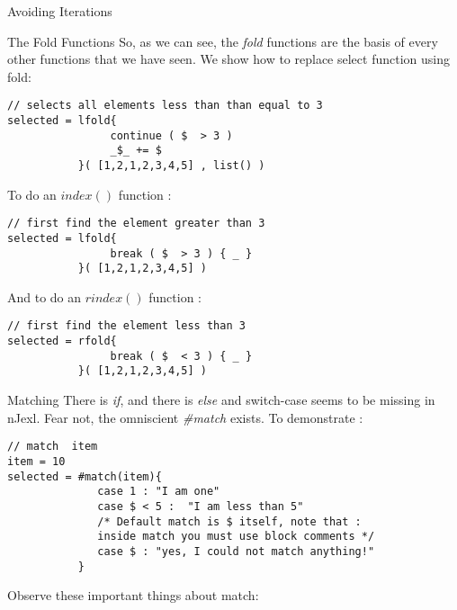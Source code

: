 \begin{section}{Avoiding Iterations}
\begin{subsection}{The Fold Functions}
So, as we can see, the \emph{fold} functions are the basis of every other functions
that we have seen. We show how to replace select function using fold: 
\begin{lstlisting}[style=JexlStyle]
// selects all elements less than than equal to 3
selected = lfold{ 
                continue ( $  > 3 )  
                _$_ += $   
           }( [1,2,1,2,3,4,5] , list() )
\end{lstlisting}

To do an $index()$ function : 

\begin{lstlisting}[style=JexlStyle]
// first find the element greater than 3
selected = lfold{ 
                break ( $  > 3 ) { _ }   
           }( [1,2,1,2,3,4,5] )
\end{lstlisting}

And to do an $rindex()$ function : 

\begin{lstlisting}[style=JexlStyle]
// first find the element less than 3
selected = rfold{ 
                break ( $  < 3 ) { _ }   
           }( [1,2,1,2,3,4,5] )
\end{lstlisting}
\end{subsection}

\begin{subsection}{Matching}
There is \emph{if}, and there is \emph{else} and switch-case 
seems to be missing in nJexl. Fear not, the omniscient \emph{\#match} exists.
To demonstrate :

\begin{center}\begin{minipage}{\linewidth}
\begin{lstlisting}[style=JexlStyle]
// match  item 
item = 10 
selected = #match(item){ 
              case 1 : "I am one" 
              case $ < 5 :  "I am less than 5"
              /* Default match is $ itself, note that :
              inside match you must use block comments */
              case $ : "yes, I could not match anything!"       
           }
\end{lstlisting}
\end{minipage}\end{center}

Observe these important things about match:


\end{subsection}
\end{section}
